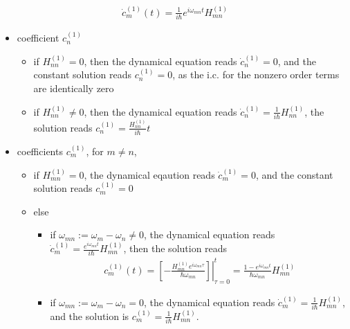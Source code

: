\documentclass[letterpaper,10pt,english]{jupyterBook}
\begin{document}
\begin{equation*}
\begin{split}
\dot c_m^{(1)}(t)= \frac{1}{i\hbar} e^{i\omega_{mn}t} H^{(1)}_{mn}
\end{split}
\end{equation*}\begin{itemize}
\item {} 
\sphinxAtStartPar
coefficient \(c_n^{(1)}\)
\begin{itemize}
\item {} 
\sphinxAtStartPar
if \(H_{nn}^{(1)} = 0\), then the dynamical equation reads \(\dot{c}^{(1)}_n = 0\), and the constant solution reads \(c^{(1)}_n = 0\), as the i.c. for the non\sphinxhyphen{}zero order terms are identically zero

\item {} 
\sphinxAtStartPar
if \(H_{nn}^{(1)} \ne 0\), then the dynamical equation reads \(\dot{c}^{(1)}_n = \frac{1}{i\hbar} H^{(1)}_{nn}\), the solution reads \(c_n^{(1)} = \frac{H^{(1)}_{nn}}{i\hbar} t\)

\end{itemize}

\item {} 
\sphinxAtStartPar
coefficients \(c_m^{(1)}\), for \(m \ne n\),
\begin{itemize}
\item {} 
\sphinxAtStartPar
if \(H^{(1)}_{mn} = 0\), the dynamical eqaution reads \(\dot{c}_m^{(1)} = 0\), and the constant solution reads \(c_m^{(1)} = 0\)

\item {} 
\sphinxAtStartPar
else
\begin{itemize}
\item {} 
\sphinxAtStartPar
if \(\omega_{mn} := \omega_m - \omega_n \ne 0\), the dynamical equation reads \(\dot{c}_m^{(1)} = \frac{e^{i \omega_{mn}t}}{i \hbar} H^{(1)}_{mn}\), then the solution reads
\begin{equation}\label{equation:ch/quantum-mechanics/qft/interactions-perturbation:eq:interactions:perturbations:cm1}
\begin{split}c_m^{(1)}(t) = \left.\left[ - \frac{H^{(1)}_{mn} e^{i \omega_{mn} \tau}}{\hbar \omega_{mn}} \right]\right|_{\tau=0}^{t} = \frac{1 - e^{i \omega_{mn} t}}{\hbar\omega_{mn}} H^{(1)}_{mn}\end{split}
\end{equation}
\item {} 
\sphinxAtStartPar
if \(\omega_{mn} := \omega_m - \omega_n = 0\), the dynamical equation reads \(\dot{c}_m^{(1)} = \frac{1}{i \hbar} H^{(1)}_{mn}\), and the solution is \(c_m^{(1)} = \frac{1}{i \hbar} H^{(1)}_{mn}\).

\end{itemize}

\end{itemize}

\end{itemize}
\end{document}
